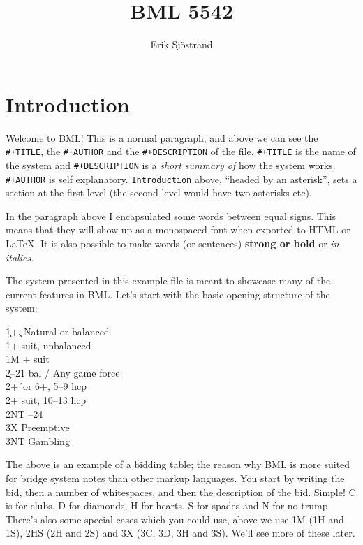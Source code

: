 \documentclass[a4paper]{article}
\title{BML 5542}
\author{Erik Sjöstrand}
\begin{document}
\maketitle
\tableofcontents

\section{Introduction}

Welcome to BML! This is a normal paragraph, and above we can see
the \texttt{\#+TITLE}, the \texttt{\#+AUTHOR} and the \texttt{\#+DESCRIPTION} of the file. \texttt{\#+TITLE} is
the name of the system and \texttt{\#+DESCRIPTION} is a \emph{short summary of} how
the system works. \texttt{\#+AUTHOR} is self explanatory. \texttt{Introduction} above,
``headed by an asterisk'', sets a section at the first level (the second
level would have two asterisks etc).

In the paragraph above I encapsulated some words between equal
signs. This means that they will show up as a monospaced font when
exported to HTML or LaTeX. It is also possible to make words (or
sentences) \textbf{strong or bold} or \emph{in italics}.

The system presented in this example file is meant to showcase many
of the current features in BML. Let's start with the basic opening
structure of the system:

\begin{bidtable}
1\c {}+\c. Natural or balanced\\
1\d {}+ suit, unbalanced\\
1M + suit\\
2\c {}--21 bal / Any game force\\
2\d {}+\h\ or 6+\s, 5--9 hcp\\
2\h\s {}+ suit, 10--13 hcp\\
2NT --24\\
3X \> Preemptive\\
3NT \> Gambling
\end{bidtable}

The above is an example of a bidding table; the reason why BML is
more suited for bridge system notes than other markup languages. You
start by writing the bid, then a number of whitespaces, and then the
description of the bid. Simple! C is for clubs, D for diamonds, H
for hearts, S for spades and N for no trump. There's also some
special cases which you could use, above we use 1M (1H and 1S), 2HS
(2H and 2S) and 3X (3C, 3D, 3H and 3S). We'll see more of these
later.
\end{document}
